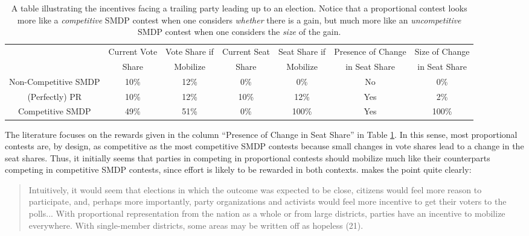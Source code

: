 \documentclass[12pt]{article}
\begin{document}
\begin{table}[!ht]
\begin{scriptsize}
\begin{tabular}{ccccccc}
 & Current Vote & Vote Share if & Current Seat & Seat Share if & Presence of Change & Size of Change \\ 
 & Share & Mobilize & Share & Mobilize& in Seat Share& in Seat Share\\ 
Non-Competitive SMDP & 10\%     & 12\%  & 0\%   & 0\%   & No    & 0\%\\ 
(Perfectly) PR       & 10\%     & 12\%  & 10\%  & 12\%  & Yes   & 2\% \\ 
Competitive SMDP     & 49\%     & 51\%  & 0\%   & 100\% & Yes   & 100\%\\ 
\end{tabular}\caption{{\normalsize A table illustrating the incentives facing a trailing party leading up to an election. Notice that a proportional contest looks more like a \textit{competitive} SMDP contest when one considers \textit{whether} there is a gain, but much more like an \textit{uncompetitive} SMDP contest when one considers the \textit{size} of the gain.}}\label{tab:example}
\end{scriptsize}
\end{table}

The literature focuses on the rewards given in the column ``Presence of  Change in Seat Share'' in Table \ref{tab:example}. In this sense, most proportional contests are, by design, as competitive as the most competitive SMDP contests because small changes in vote shares lead to a change in the seat shares. Thus, it initially seems that parties in competing in proportional contests should mobilize much like their counterparts competing in competitive SMDP contests, since effort is likely to be rewarded in both contexts. \cite{Powell1986} makes the point quite clearly:

\begin{quote}
Intuitively, it would seem that elections in which the outcome was expected to be close, citizens would feel more reason to participate, and, perhaps more importantly, party organizations and activists would feel more incentive to get their voters to the polls... With proportional representation from the nation as a whole or from large districts, parties have an incentive to mobilize everywhere. With single-member districts, some areas may be written off as hopeless (21).
\end{quote}
\end{document}
